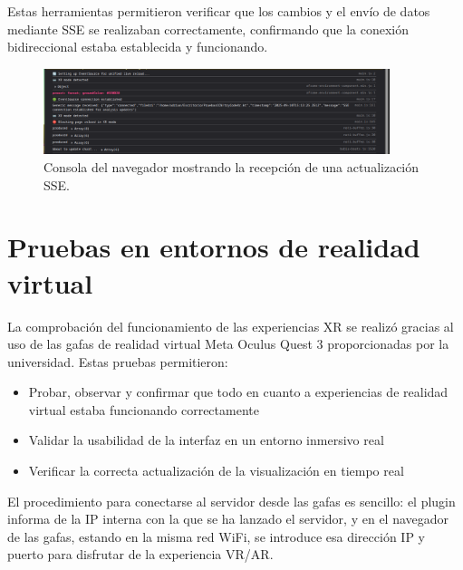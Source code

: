 \documentclass[a4paper, 12pt]{book}
\begin{document}
Estas herramientas permitieron verificar que los cambios y el envío de datos mediante SSE se realizaban correctamente, confirmando que la conexión bidireccional estaba establecida y funcionando.


\begin{figure}[H]
\centering
\includegraphics[width=0.9\textwidth]{img/sse-updates-browser.png}
\caption{Consola del navegador mostrando la recepción de una actualización SSE.}
\label{fig:sse-updates-browser}
\end{figure}

\section{Pruebas en entornos de realidad virtual}
\label{sec:pruebas-vr}

La comprobación del funcionamiento de las experiencias XR se realizó gracias al uso de las gafas de realidad virtual Meta Oculus Quest 3 proporcionadas por la universidad. Estas pruebas permitieron:

\begin{itemize}
  \item Probar, observar y confirmar que todo en cuanto a experiencias de realidad virtual estaba funcionando correctamente
  \item Validar la usabilidad de la interfaz en un entorno inmersivo real
  \item Verificar la correcta actualización de la visualización en tiempo real
\end{itemize}

El procedimiento para conectarse al servidor desde las gafas es sencillo: el plugin informa de la IP interna con la que se ha lanzado el servidor, y en el navegador de las gafas, estando en la misma red WiFi, se introduce esa dirección IP y puerto para disfrutar de la experiencia VR/AR.

\end{document}

